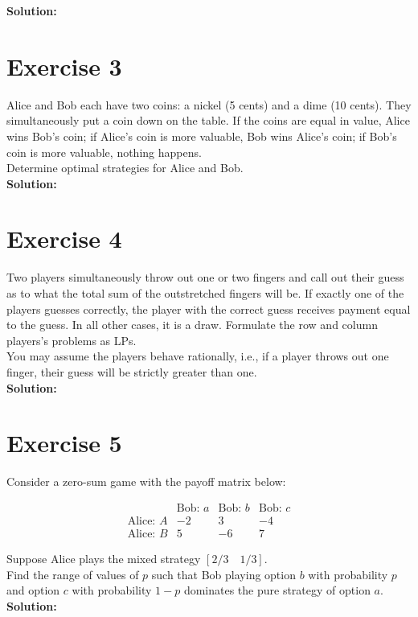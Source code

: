 \documentclass{article}
\begin{document}
\textbf{Solution: } \\



\newpage

\section*{Exercise 3}
Alice and Bob each have two coins: a nickel (5 cents) and a dime (10 cents). They simultaneously put a coin down on the table. If the coins are equal in value, Alice wins Bob's coin; if Alice's coin is more valuable, Bob wins Alice's coin; if Bob's coin is more valuable, nothing happens. \\

Determine optimal strategies for Alice and Bob. \\

\textbf{Solution: } \\



\newpage

\section*{Exercise 4}
Two players simultaneously throw out one or two fingers and call out their guess as to what the total sum of the outstretched fingers will be. If exactly one of the players guesses correctly, the player with the correct guess receives payment equal to the guess. In all other cases, it is a draw. Formulate the row and column players's problems as LPs. \\

You may assume the players behave rationally, i.e., if a player throws out one finger, their guess will be strictly greater than one. \\

\textbf{Solution: } \\



\newpage

\section*{Exercise 5}
Consider a zero-sum game with the payoff matrix below:

$$\begin{array}{c|ccc}
& \text{Bob: } a & \text{Bob: } b & \text{Bob: } c \\
\hline
\text{Alice: } A & -2 & 3 & -4 \\
\text{Alice: } B & 5 & -6 & 7
\end{array}$$

Suppose Alice plays the mixed strategy $\left[2/3 \quad 1/3\right]$. \\

Find the range of values of $p$ such that Bob playing option $b$ with probability $p$ and option $c$ with probability $1 - p$ dominates the pure strategy of option $a$. \\

\textbf{Solution: } \\
\end{document}
